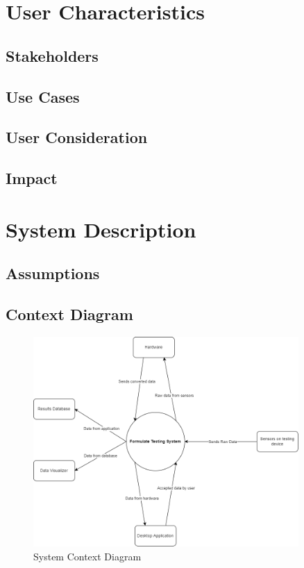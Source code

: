 \documentclass[12pt]{article}
\begin{document}
\section{User Characteristics}


\subsection{Stakeholders}


\subsection{Use Cases} 

\subsection{User Consideration}

\subsection{Impact}


\section{System Description}

\subsection{Assumptions}

\subsection{Context Diagram}
\begin{figure}[h!]
\begin{center}
\includegraphics[width=0.9\textwidth]{sys_context_diagram}
\caption{System Context Diagram}
\label{Fig_SystemContext} 
\end{center}
\end{figure}
\end{document}
